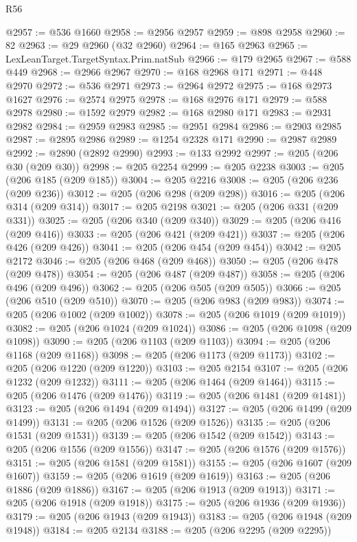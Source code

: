 \begin{lexlean}{R56}
\begin{coremodule}
{{{{{{{{{{{{{{{{{{{{{{{{{{{{{{{{{{{{{{{{{{{{{{{{{{{{{{{{{{{{{{{{{{{{{{{{{{{{{{{{{{{{{{{{{{{{{{{{{{{{{{{{{{{{{{{{{{{{{{{{{{{{{{{{{{{{{{{{{{{{{{{{{{{{{{{{{{{{{{{{{{{{{{{{{{{{{{{{{{{{{{{{{{{{{{{{{{{{{{{{{{{{{{{{{{{@2957 := @536 @1660
@2958 := @2956 @2957
@2959 := @898 @2958
@2960 := 82
@2963 := @29 @2960 (@32 @2960)
@2964 := @165 @2963
@2965 := LexLeanTarget.TargetSyntax.Prim.natSub
@2966 := @179 @2965
@2967 := @588 @449
@2968 := @2966 @2967
@2970 := @168 @2968 @171
@2971 := @448 @2970
@2972 := @536 @2971
@2973 := @2964 @2972
@2975 := @168 @2973 @1627
@2976 := @2574 @2975
@2978 := @168 @2976 @171
@2979 := @588 @2978
@2980 := @1592 @2979
@2982 := @168 @2980 @171
@2983 := @2931 @2982
@2984 := @2959 @2983
@2985 := @2951 @2984
@2986 := @2903 @2985
@2987 := @2895 @2986
@2989 := @1254 @2328 @171
@2990 := @2987 @2989
@2992 := @2890 (@2892 @2990)
@2993 := @133 @2992
@2997 := @205 (@206 @30 (@209 @30))
@2998 := @205 @2254
@2999 := @205 @2238
@3003 := @205 (@206 @185 (@209 @185))
@3004 := @205 @2216
@3008 := @205 (@206 @236 (@209 @236))
@3012 := @205 (@206 @298 (@209 @298))
@3016 := @205 (@206 @314 (@209 @314))
@3017 := @205 @2198
@3021 := @205 (@206 @331 (@209 @331))
@3025 := @205 (@206 @340 (@209 @340))
@3029 := @205 (@206 @416 (@209 @416))
@3033 := @205 (@206 @421 (@209 @421))
@3037 := @205 (@206 @426 (@209 @426))
@3041 := @205 (@206 @454 (@209 @454))
@3042 := @205 @2172
@3046 := @205 (@206 @468 (@209 @468))
@3050 := @205 (@206 @478 (@209 @478))
@3054 := @205 (@206 @487 (@209 @487))
@3058 := @205 (@206 @496 (@209 @496))
@3062 := @205 (@206 @505 (@209 @505))
@3066 := @205 (@206 @510 (@209 @510))
@3070 := @205 (@206 @983 (@209 @983))
@3074 := @205 (@206 @1002 (@209 @1002))
@3078 := @205 (@206 @1019 (@209 @1019))
@3082 := @205 (@206 @1024 (@209 @1024))
@3086 := @205 (@206 @1098 (@209 @1098))
@3090 := @205 (@206 @1103 (@209 @1103))
@3094 := @205 (@206 @1168 (@209 @1168))
@3098 := @205 (@206 @1173 (@209 @1173))
@3102 := @205 (@206 @1220 (@209 @1220))
@3103 := @205 @2154
@3107 := @205 (@206 @1232 (@209 @1232))
@3111 := @205 (@206 @1464 (@209 @1464))
@3115 := @205 (@206 @1476 (@209 @1476))
@3119 := @205 (@206 @1481 (@209 @1481))
@3123 := @205 (@206 @1494 (@209 @1494))
@3127 := @205 (@206 @1499 (@209 @1499))
@3131 := @205 (@206 @1526 (@209 @1526))
@3135 := @205 (@206 @1531 (@209 @1531))
@3139 := @205 (@206 @1542 (@209 @1542))
@3143 := @205 (@206 @1556 (@209 @1556))
@3147 := @205 (@206 @1576 (@209 @1576))
@3151 := @205 (@206 @1581 (@209 @1581))
@3155 := @205 (@206 @1607 (@209 @1607))
@3159 := @205 (@206 @1619 (@209 @1619))
@3163 := @205 (@206 @1886 (@209 @1886))
@3167 := @205 (@206 @1913 (@209 @1913))
@3171 := @205 (@206 @1918 (@209 @1918))
@3175 := @205 (@206 @1936 (@209 @1936))
@3179 := @205 (@206 @1943 (@209 @1943))
@3183 := @205 (@206 @1948 (@209 @1948))
@3184 := @205 @2134
@3188 := @205 (@206 @2295 (@209 @2295))
}}}}}}}}}}}}}}}}}}}}}}}}}}}}}}}}}}}}}}}}}}}}}}}}}}}}}}}}}}}}}}}}}}}}}}}}}}}}}}}}}}}}}}}}}}}}}}}}}}}}}}}}}}}}}}}}}}}}}}}}}}}}}}}}}}}}}}}}}}}}}}}}}}}}}}}}}}}}}}}}}}}}}}}}}}}}}}}}}}}}}}}}}}}}}}}}}}}}}}}}}}}}}}}}}}}
\end{coremodule}
\end{lexlean}
